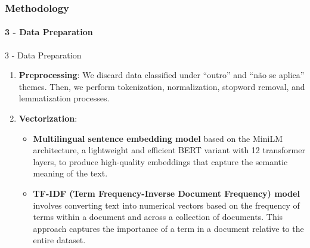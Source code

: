 \begin{frame}
	\frametitle{Methodology}
	\framesubtitle{3 - Data Preparation}	

	\begin{block}{3 - Data Preparation} 
		\begin{enumerate}

			\item \textbf{Preprocessing}: We discard data classified under ``outro'' and ``não se aplica'' themes. Then, we perform tokenization, normalization, stopword removal, and lemmatization processes.
			
			\item \textbf{Vectorization}:
			\begin{itemize}
				\item \textbf{Multilingual sentence embedding model} based on the MiniLM architecture, a lightweight and efficient BERT variant with 12 transformer layers, to produce high-quality embeddings that capture the semantic meaning of the text. 
				
				\item \textbf{TF-IDF (Term Frequency-Inverse Document Frequency) model} involves converting text into numerical vectors based on the frequency of terms within a document and across a collection of documents. This approach captures the importance of a term in a document relative to the entire dataset.
			\end{itemize}
		\end{enumerate}
	\end{block}
\end{frame}



	



